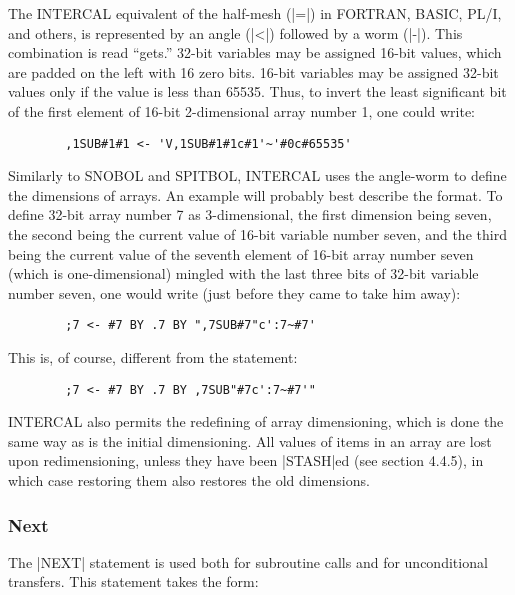 The INTERCAL equivalent of the half-mesh (|=|) in FORTRAN, BASIC, PL/I, and
others, is represented by an angle (|<|) followed by a worm (|-|).  This
combination is read ``gets.''  32-bit variables may be assigned 16-bit
values, which are padded on the left with 16 zero bits.  16-bit variables
may be assigned 32-bit values only if the value is less than 65535.  Thus,
to invert the least significant bit of the first element of 16-bit
2-dimensional array number 1, one could write:

\begin{verbatim}
        ,1SUB#1#1 <- 'V,1SUB#1#1c#1'~'#0c#65535'
\end{verbatim}

Similarly to SNOBOL and SPITBOL, INTERCAL uses the angle-worm to define the
dimensions of arrays.  An example will probably best describe the format.
To define 32-bit array number 7 as 3-dimensional, the first dimension being
seven, the second being the current value of 16-bit variable number seven,
and the third being the current value of the seventh element of 16-bit
array number seven (which is one-dimensional) mingled with the last three
bits of 32-bit variable number seven, one would write (just before they
came to take him away):

\begin{verbatim}
        ;7 <- #7 BY .7 BY ",7SUB#7"c':7~#7'
\end{verbatim}
This is, of course, different from the statement:

\begin{verbatim}
        ;7 <- #7 BY .7 BY ,7SUB"#7c':7~#7'"
\end{verbatim}

INTERCAL also permits the redefining of array dimensioning, which is done
the same way as is the initial dimensioning.  All values of items in an
array are lost upon redimensioning, unless they have been |STASH|ed (see
section 4.4.5), in which case restoring them also restores the old
dimensions.







\subsubsection{Next}

The |NEXT| statement is used both for subroutine calls and for
unconditional transfers.  This statement takes the form:

